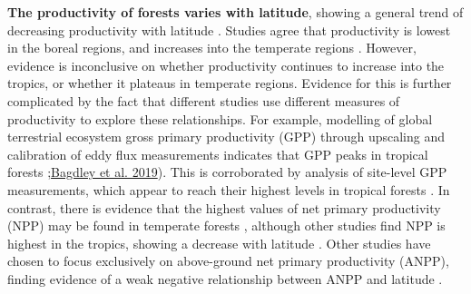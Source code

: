 \documentclass[]{article}
\begin{document}
\textbf{The productivity of forests varies with latitude}, showing a
general trend of decreasing productivity with latitude
\citep{beer_terrestrial_2010, jung_global_2011}. Studies agree that
productivity is lowest in the boreal regions, and increases into the
temperate regions
\citep{luyssaert_co_2007, huston_global_2009, beer_terrestrial_2010, jung_global_2011}.
However, evidence is inconclusive on whether productivity continues to
increase into the tropics, or whether it plateaus in temperate regions.
Evidence for this is further complicated by the fact that different
studies use different measures of productivity to explore these
relationships. For example, modelling of global terrestrial ecosystem
gross primary productivity (GPP) through upscaling and calibration of
eddy flux measurements indicates that GPP peaks in tropical forests
\citep{beer_terrestrial_2010, jung_global_2011};\href{https://onlinelibrary.wiley.com/doi/epdf/10.1111/gcb.14729}{Bagdley
et al. 2019}). This is corroborated by analysis of site-level GPP
measurements, which appear to reach their highest levels in tropical
forests \citep{luyssaert_co_2007}. In contrast, there is evidence that
the highest values of net primary productivity (NPP) may be found in
temperate forests \citep{luyssaert_co_2007, huston_global_2009},
although other studies find NPP is highest in the tropics, showing a
decrease with latitude \citep{simova_enigma_2017}. Other studies have
chosen to focus exclusively on above-ground net primary productivity
(ANPP), finding evidence of a weak negative relationship between ANPP
and latitude \citep{huston_global_2009, gillman_latitude_2015}.
\end{document}
